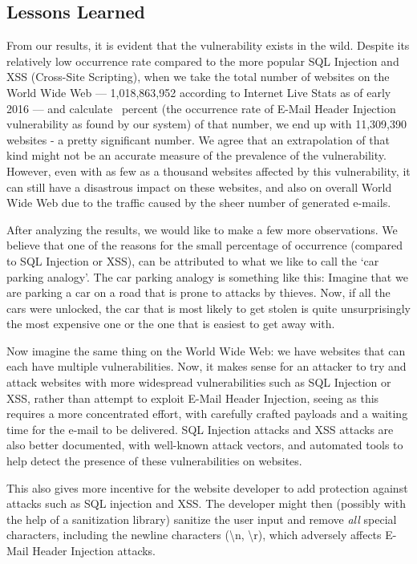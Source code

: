 \subsection{Lessons Learned}
    From our results, it is evident that the vulnerability exists in the wild. Despite its relatively low occurrence rate compared to the more popular SQL Injection and XSS (Cross-Site Scripting), when we take the total number of websites on the World Wide Web --- 1,018,863,952 according to Internet Live Stats \cite{InternetLiveStats2016} as of early 2016 --- and calculate \successDelta\ percent (the occurrence rate of E-Mail Header Injection vulnerability as found by our system) of that number, we end up with 11,309,390 websites - a pretty significant number. We agree that an extrapolation of that kind might not be an accurate measure of the prevalence of the vulnerability. However, even with as few as a thousand websites affected by this vulnerability, it can still have a disastrous impact on these websites, and also on overall World Wide Web due to the traffic caused by the sheer number of generated e-mails. 
    
    After analyzing the results, we would like to make a few more observations. We believe that one of the reasons for the small percentage of occurrence (compared to SQL Injection or XSS), can be attributed to what we like to call the `car parking analogy'.
    The car parking analogy is something like this: Imagine that we are parking a car on a road that is prone to attacks by thieves. Now, if all the cars were unlocked, the car that is most likely to get stolen is quite unsurprisingly the most expensive one or the one that is easiest to get away with.
    
    Now imagine the same thing on the World Wide Web: we have websites that can each have multiple vulnerabilities. Now, it makes sense for an attacker to try and attack websites with more widespread vulnerabilities such as SQL Injection or XSS, rather than attempt to exploit E-Mail Header Injection, seeing as this requires a more concentrated effort, with carefully crafted payloads and a waiting time for the e-mail to be delivered. SQL Injection attacks and XSS attacks are also better documented, with well-known attack vectors, and automated tools to help detect the presence of these vulnerabilities on websites.
    
    This also gives more incentive for the website developer to add protection against attacks such as SQL injection and XSS. The developer might then (possibly with the help of a sanitization library) sanitize the user input and remove \emph{all} special characters, including the newline characters (\textbackslash{}n, \textbackslash{}r), which adversely affects E-Mail Header Injection attacks.

